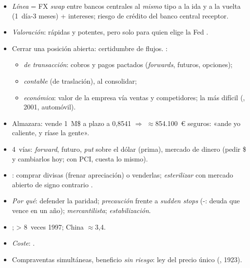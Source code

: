 \documentclass{article}
\begin{document}
\begin{columnas}
\begin{itemize}
\begin{itemize}
  \end{itemize}
\item \emph{Línea} = FX \emph{swap} entre bancos centrales al \emph{mismo} tipo a la ida y a la vuelta (1~día-3 meses) + intereses; riesgo de crédito del banco central receptor.
\item \emph{Valoración}: rápidas y potentes, pero solo para quien elige la Fed .
\end{itemize}
\begin{itemize}
\item Cerrar una posición abierta: certidumbre de flujos. :
  \begin{itemize}
  \item \emph{de transacción}: cobros y pagos pactados (\emph{forwards}, futuros, opciones);
  \item \emph{contable} (de traslación), al consolidar;
  \item \emph{económica}: valor de la empresa vía ventas y competidores; la más difícil (, 2001, automóvil).
  \end{itemize}
\item Almazara: vende 1~M\$ a plazo a 0,8541 $\Rightarrow$ $\approx$854.100~€ seguros: «ande yo caliente, y ríase la gente».
\item 4~vías: \emph{forward}, futuro, \emph{put} sobre el dólar (prima), mercado de dinero (pedir \$ y cambiarlos hoy; con PCI, cuesta lo mismo).
\end{itemize}
\begin{itemize}
\item {}: comprar divisas (frenar apreciación) o venderlas; \emph{esterilizar} con mercado abierto de signo contrario .
\item \emph{Por qué}: defender la paridad; \emph{precaución} frente a \emph{sudden stops} (-: deuda que vence en un año); \emph{mercantilista}; \emph{estabilización}.
\item {}; > 8~veces 1997; China $\approx$3,4.
\item \emph{Coste}: .
\end{itemize}
\begin{itemize}
\item Compraventas simultáneas, beneficio \emph{sin riesgo}: ley del precio único (, 1923).

\end{itemize}
\end{columnas}
\end{document}
